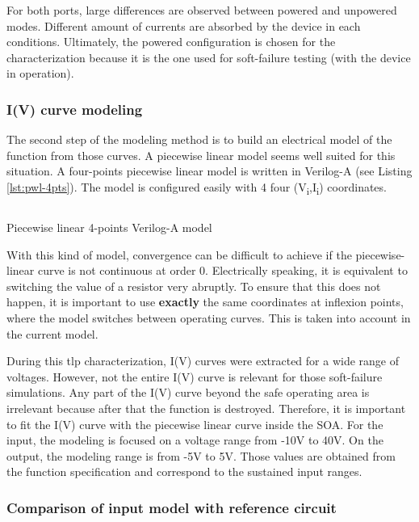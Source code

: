 For both ports, large differences are observed between powered and unpowered modes.
Different amount of currents are absorbed by the device in each conditions.
Ultimately, the powered configuration is chosen for the characterization because it is the one used for soft-failure testing (with the device in operation).

\subsubsection{I(V) curve modeling}

The second step of the modeling method is to build an electrical model of the function from those curves.
A piecewise linear model seems well suited for this situation.
A four-points piecewise linear model is written in Verilog-A (see Listing \ref{lst:pwl-4pts}).
The model is configured easily with 4 four (V\textsubscript{i},I\textsubscript{i}) coordinates.

\begin{code}
\inputminted[frame=single]{verilog}{src/4/snippets/pwl_4pts.va}
\caption{Piecewise linear 4-points Verilog-A model}
\label{lst:pwl-4pts}
\end{code}

With this kind of model, convergence can be difficult to achieve if the piecewise-linear curve is not continuous at order 0.
Electrically speaking, it is equivalent to switching the value of a resistor very abruptly.
To ensure that this does not happen, it is important to use \textbf{exactly} the same coordinates at inflexion points, where the model switches between operating curves.
This is taken into account in the current model.

During this \gls{tlp} characterization, I(V) curves were extracted for a wide range of voltages.
However, not the entire I(V) curve is relevant for those soft-failure simulations.
Any part of the I(V) curve beyond the safe operating area is irrelevant because after that the function is destroyed.
Therefore, it is important to fit the I(V) curve with the piecewise linear curve inside the SOA.
For the input, the modeling is focused on a voltage range from -10V to 40V.
On the output, the modeling range is from -5V to 5V.
Those values are obtained from the function specification and correspond to the sustained input ranges.

\subsubsection{Comparison of input model with reference circuit}

